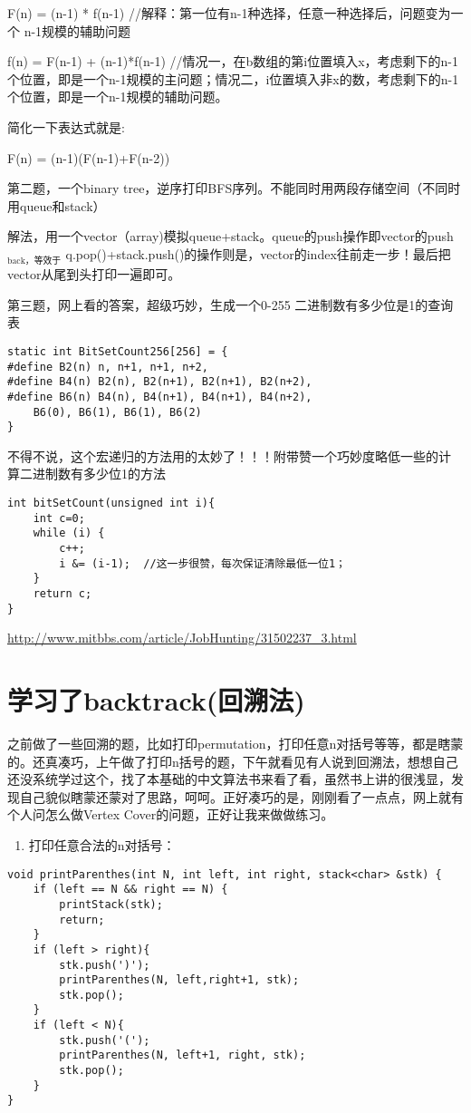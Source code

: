 \documentclass[12pt]{book}
\begin{document}
F(n) = (n-1) * f(n-1)    //解释：第一位有n-1种选择，任意一种选择后，问题变为一个 n-1规模的辅助问题

f(n) = F(n-1) + (n-1)*f(n-1)   //情况一，在b数组的第i位置填入x，考虑剩下的n-1个位置，即是一个n-1规模的主问题；情况二，i位置填入非x的数，考虑剩下的n-1个位置，即是一个n-1规模的辅助问题。

简化一下表达式就是:

F(n) = (n-1)(F(n-1)+F(n-2))

第二题，一个binary tree，逆序打印BFS序列。不能同时用两段存储空间（不同时用queue和stack）

解法，用一个vector（array)模拟queue+stack。queue的push操作即vector的push$_{\text{back，等效于}}$ q.pop()+stack.push()的操作则是，vector的index往前走一步！最后把vector从尾到头打印一遍即可。

第三题，网上看的答案，超级巧妙，生成一个0-255 二进制数有多少位是1的查询表
\lstset{language=java,label= ,caption= ,numbers=none}
\begin{lstlisting}
static int BitSetCount256[256] = {
#define B2(n) n, n+1, n+1, n+2,
#define B4(n) B2(n), B2(n+1), B2(n+1), B2(n+2),
#define B6(n) B4(n), B4(n+1), B4(n+1), B4(n+2),
    B6(0), B6(1), B6(1), B6(2)
}
\end{lstlisting}

不得不说，这个宏递归的方法用的太妙了！！！附带赞一个巧妙度略低一些的计
算二进制数有多少位1的方法
\lstset{language=java,label= ,caption= ,numbers=none}
\begin{lstlisting}
int bitSetCount(unsigned int i){
    int c=0;
    while (i) {
        c++;
        i &= (i-1);  //这一步很赞，每次保证清除最低一位1；
    }
    return c;
}
\end{lstlisting}

\url{http://www.mitbbs.com/article/JobHunting/31502237_3.html}

\section{学习了backtrack(回溯法)}
\label{sec-26-3}

之前做了一些回溯的题，比如打印permutation，打印任意n对括号等等，都是瞎蒙的。还真凑巧，上午做了打印n括号的题，下午就看见有人说到回溯法，想想自己还没系统学过这个，找了本基础的中文算法书来看了看，虽然书上讲的很浅显，发现自己貌似瞎蒙还蒙对了思路，呵呵。正好凑巧的是，刚刚看了一点点，网上就有个人问怎么做Vertex Cover的问题，正好让我来做做练习。

\begin{enumerate}
\item 打印任意合法的n对括号：
\end{enumerate}
\lstset{language=java,label= ,caption= ,numbers=none}
\begin{lstlisting}
void printParenthes(int N, int left, int right, stack<char> &stk) {
    if (left == N && right == N) {
        printStack(stk);
        return;
    }
    if (left > right){
        stk.push(')');
        printParenthes(N, left,right+1, stk);
        stk.pop();
    }
    if (left < N){
        stk.push('(');
        printParenthes(N, left+1, right, stk);
        stk.pop();
    }   
}
\end{lstlisting}
\end{document}

